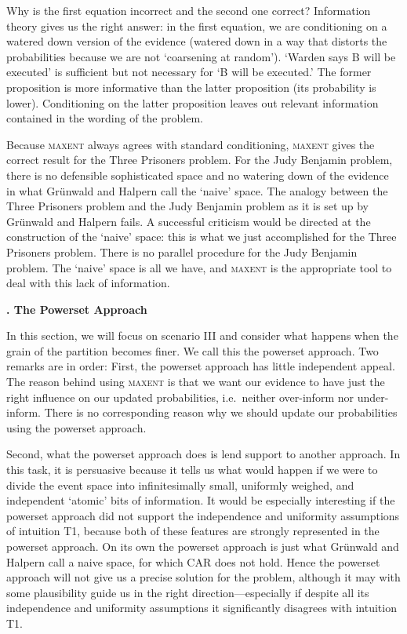 \documentclass[12pt]{article}
\newcommand{\kapt}[1]{\noindent \textbf{{\thechap}. #1}\addtocounter{chap}{1}}
\newcommand{\qnull}[1]{`#1'}
\newcommand{\nias}{\noindent} %
\newcommand{\nial}{\noindent} %
\begin{document}
\nial Why is the first equation incorrect and the second one correct?
Information theory gives us the right answer: in the first equation,
we are conditioning on a watered down version of the evidence (watered
down in a way that distorts the probabilities because we are not
\qnull{coarsening at random}). \qnull{Warden says B will be executed}
is sufficient but not necessary for \qnull{B will be executed.} The
former proposition is more informative than the latter proposition
(its probability is lower). Conditioning on the latter proposition
leaves out relevant information contained in the wording of the
problem.

Because \textsc{maxent} always agrees with standard conditioning,
\textsc{maxent} gives the correct result for the Three Prisoners
problem. For the Judy Benjamin problem, there is no defensible
sophisticated space and no watering down of the evidence in what
Gr{\"u}nwald and Halpern call the \qnull{naive} space. The analogy
between the Three Prisoners problem and the Judy Benjamin problem as
it is set up by Gr{\"u}nwald and Halpern fails. A successful criticism
would be directed at the construction of the \qnull{naive} space: this
is what we just accomplished for the Three Prisoners problem. There is
no parallel procedure for the Judy Benjamin problem. The \qnull{naive}
space is all we have, and \textsc{maxent} is the appropriate tool to
deal with this lack of information.

\medskip

\kapt{The Powerset Approach}

\nias In this section, we will focus on scenario III and consider what
happens when the grain of the partition becomes finer. We call this
the powerset approach. Two remarks are in order: First, the powerset
approach has little independent appeal. The reason behind using
\textsc{maxent} is that we want our evidence to have just the right
influence on our updated probabilities, i.e.\ neither over-inform
nor under-inform. There is no corresponding reason why we should
update our probabilities using the powerset approach.

Second, what the powerset approach does is lend support to another
approach. In this task, it is persuasive because it tells us what
would happen if we were to divide the event space into infinitesimally
small, uniformly weighed, and independent \qnull{atomic} bits of
information. It would be especially interesting if the powerset
approach did not support the independence and uniformity assumptions
of intuition T1, because both of these features are strongly
represented in the powerset approach. On its own the powerset approach
is just what Gr{\"u}nwald and Halpern call a naive space, for which
CAR does not hold. Hence the powerset approach will not give us a
precise solution for the problem, although it may with some
plausibility guide us in the right direction---especially if despite
all its independence and uniformity assumptions it significantly
disagrees with intuition T1.
\end{document}
